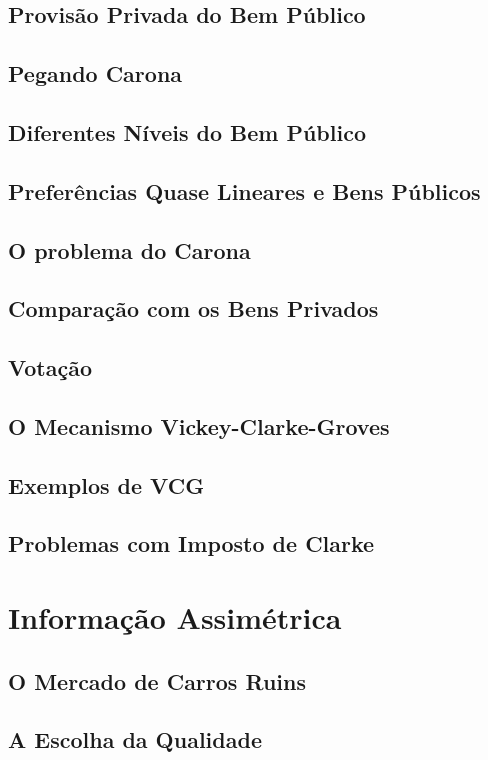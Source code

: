 \documentclass[a4paper,11pt,oneside]{book}
\theoremstyle{definition}
\theoremstyle{break}
\begin{document}
\section{Provisão Privada do Bem Público}
\section{Pegando Carona}
\section{Diferentes Níveis do Bem Público}
\section{Preferências Quase Lineares e Bens Públicos}
\section{O problema do Carona}
\section{Comparação com os Bens Privados}
\section{Votação}
\section{O Mecanismo Vickey-Clarke-Groves}
\section{Exemplos de VCG}
\section{Problemas com Imposto de Clarke}

\chapter{Informação Assimétrica}

\section{O Mercado de Carros Ruins}
\section{A Escolha da Qualidade}
\end{document}
